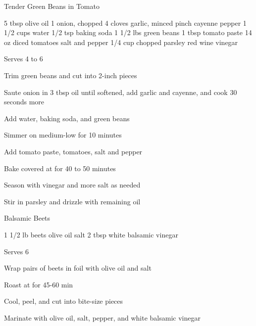 \begin{denserecipe}{Tender Green Beans in Tomato}{\vegetarian{}}
\begin{ingredients}
5 tbsp olive oil
1 onion, chopped
4 cloves garlic, minced
pinch cayenne pepper
1 1/2 cups water
1/2 tsp baking soda
1 1/2 lbs green beans
1 tbsp tomato paste
14 oz diced tomatoes
salt and pepper
1/4 cup chopped parsley
red wine vinegar
\end{ingredients}
\nextcolumn
Serves 4 to 6
\begin{steps}
    \item Trim green beans and cut into 2-inch pieces
    \item Saute onion in 3 tbsp oil until softened, add garlic and cayenne, and cook 30 seconds more
    \item Add water, baking soda, and green beans
    \item Simmer on medium-low for 10 minutes
    \item Add tomato paste, tomatoes, salt and pepper
    \item Bake covered at  for 40 to 50 minutes
    \item Season with vinegar and more salt as needed
    \item Stir in parsley and drizzle with remaining oil
\end{steps}
\end{denserecipe}

\begin{recipe}{Balsamic Beets}{\vegetarian{}}
\begin{ingredients}
1 1/2 lb beets
olive oil
salt
2 tbsp white balsamic vinegar
\end{ingredients}
\nextcolumn
Serves 6
\begin{steps}
\item Wrap pairs of beets in foil with olive oil and salt
\item Roast at  for 45-60 min
\item Cool, peel, and cut into bite-size pieces
\item Marinate with olive oil, salt, pepper, and white balsamic vinegar
\end{steps}
\end{recipe}
